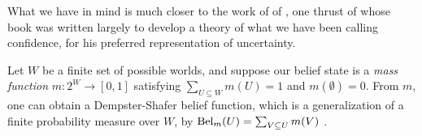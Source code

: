 




What we have in mind is much closer to the work of 
of \citeauthor{shafer1976mathematical}, one thrust of
whose \citeyear{shafer1976mathematical} book was written largely to
develop a theory of what we have been calling confidence,
for his preferred representation of uncertainty. 

\begin{example} \label{ex:shafer}
Let $W$ be a finite set of possible worlds, 
and suppose our belief state is a 
\emph{mass function} $m : 2^W \! \to\! [0,1]$
satisfying $\sum_{U \subseteq W} m(U) \!=\! 1$ 
and $m(\emptyset) \!=\! 0$. 
From $m$, one can obtain 
a Dempster-Shafer belief function, 
which is a generalization of a finite probability measure over $W$, by
$\mathrm{Bel}_m(U) = \sum_{V \subseteq U} m(V)$
\parencite{shafer1976mathematical}.
%


\end{example}
